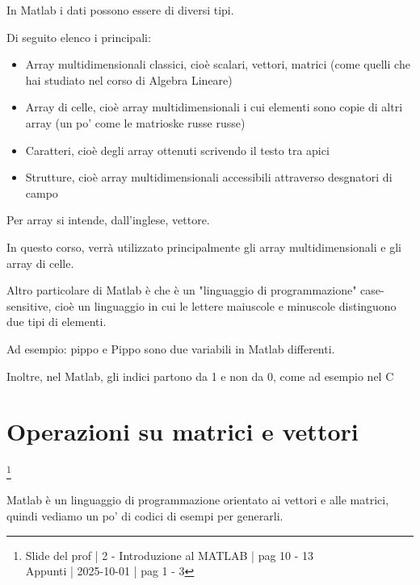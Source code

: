 In Matlab i dati possono essere di diversi tipi. \newline 

Di seguito elenco i principali: 

\begin{itemize}
    \item Array multidimensionali classici, cioè scalari, vettori, matrici (come quelli che hai studiato nel corso di Algebra Lineare) 
    \item Array di celle, cioè array multidimensionali i cui elementi sono copie di altri array (un po' come le matrioske russe russe) 
    \item Caratteri, cioè degli array ottenuti scrivendo il testo tra apici 
    \item Strutture, cioè array multidimensionali accessibili attraverso desgnatori di campo  
\end{itemize}


\begin{tcolorbox}
    Per array si intende, dall'inglese, vettore. \newline 

    In questo corso, verrà utilizzato principalmente gli array multidimensionali e gli array di celle. \newline 

    Altro particolare di Matlab è che è un "linguaggio di programmazione" case-sensitive, cioè un linguaggio in cui le lettere maiuscole e minuscole distinguono due tipi di elementi. \newline 

    Ad esempio: pippo e Pippo sono due variabili in Matlab differenti. \newline 

    Inoltre, nel Matlab, gli indici partono da 1 e non da 0, come ad esempio nel C
\end{tcolorbox} 

\newpage 

\section{Operazioni su matrici e vettori}

\footnote{ 
    Slide del prof | 2 - Introduzione al MATLAB | pag 10 - 13\\
    Appunti | 2025-10-01 | pag 1 - 3 
}

Matlab è un linguaggio di programmazione orientato ai vettori e alle matrici, quindi vediamo un po' di codici di esempi per generarli. \newline 

